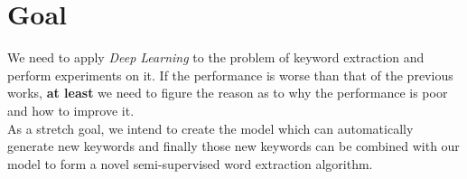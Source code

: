 \documentclass[dvips,12pt]{article}
\begin{document}
	\section{Goal}
	We need to apply \emph{Deep Learning} to the problem of keyword extraction and perform experiments on it. If the performance is worse than that of the previous works, \textbf{at least} we need to figure the reason as to why the performance is poor and how to improve it. \\
	As a stretch goal, we intend to create the model which can automatically generate new keywords and finally those new keywords can be combined with our model to form a novel semi-supervised word extraction algorithm.
\end{document}
